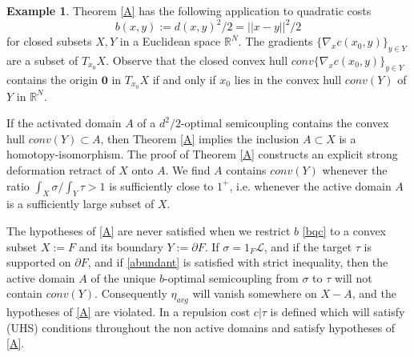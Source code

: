 \documentclass[12pt]{amsart}
\theoremstyle{definition}
\newtheorem*{exx}{Example}
\theoremstyle{remark}
\newcommand{\bR}{\mathbb{R}}
\newcommand{\del}{\partial}
\begin{document}
\begin{exx}
Theorem \ref{A} has the following application to quadratic costs \begin{equation}\label{bqc} b(x,y):=d(x,y)^2/2=||x-y||^2/2\end{equation} for closed subsets $X,Y$ in a Euclidean space $\bR^N$. The gradients $\{\nabla_x c(x_0,y)\}_{y \in Y}$ are a subset of $T_{x_0} X$. Observe that the closed convex hull $conv\{\nabla_x c(x_0,y)\}_{y \in Y}$ contains the origin $\textbf{0}$ in $T_{x_0} X$ if and only if $x_0$ lies in the convex hull $conv(Y)$ of $Y$ in $\bR^N$. 

If the activated domain $A$ of a $d^2/2$-optimal semicoupling contains the convex hull $conv(Y) \subset A$, then Theorem \ref{A} implies the inclusion $A\subset X$ is a homotopy-isomorphism. The proof of Theorem \ref{A} constructs an explicit strong deformation retract of $X$ onto $A$.  We find $A$ contains $conv(Y)$ whenever the ratio $\int_X \sigma / \int_Y \tau>1$ is sufficiently close to $1^+$, i.e. whenever the active domain $A$ is a sufficiently large subset of $X$. 


The hypotheses of \ref{A} are never satisfied when we restrict $b$ \eqref{bqc} to a convex subset $X:=F$ and its boundary $Y:=\del F$. If $\sigma=1_F \mathscr{L}$, and if the target $\tau$ is supported on $\del F$, and if \eqref{abundant} is satisfied with strict inequality, then the active domain $A$ of the unique $b$-optimal semicoupling from $\sigma$ to $\tau$ will not contain $conv(Y)$. Consequently $\eta_{avg}$ will vanish somewhere on $X-A$, and the hypotheses of \ref{A} are violated. In \cite[Ch.4]{martel} a repulsion cost $c|\tau$ is defined which will satisfy (UHS) conditions throughout the non active domains and satisfy hypotheses of \ref{A}. 
\end{exx}
\end{document}
